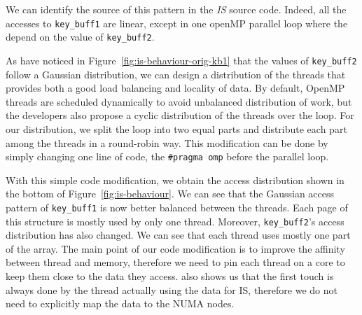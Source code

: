 %

We can identify the source of this pattern in the \emph{IS} source code. Indeed, all the accesses to \texttt{key\_buff1} are linear,
except in one openMP parallel loop where the depend on the value of
\texttt{key\_buff2}.

As have noticed in Figure~\ref{fig:is-behaviour-orig-kb1} that the values of \texttt{key\_buff2}
follow a Gaussian distribution, we can design a distribution of the threads that
provides both a good load balancing and locality of data.
By default, OpenMP threads are scheduled dynamically to avoid unbalanced
distribution of work, but the developers also propose a cyclic distribution
of the threads over the loop.
For our distribution, we split
the loop into two equal parts and distribute each part among the threads in a round-robin way.
This modification can be done by simply changing one line of code, the
\texttt{\#pragma omp} before the parallel loop.



With this simple code modification, we obtain the access distribution
shown in the bottom of Figure~\ref{fig:is-behaviour}. We can see that the Gaussian
access pattern of \texttt{key\_buff1} is now better balanced between the threads. Each page
of this structure is mostly used by only one thread. Moreover,
\texttt{key\_buff2}'s access distribution has also changed. We can see that
each thread uses mostly one part of the array.
The main point of our code modification is to improve the affinity between
thread and memory, therefore we need to pin each thread on a core to keep them
close to the data they access. %
\TABARNAC also shows us that the first touch is always done by the thread actually using
the data for IS, therefore we do not need to explicitly map the data to the NUMA nodes.

